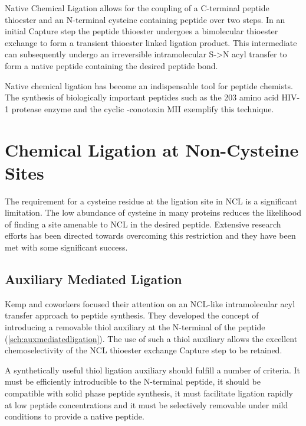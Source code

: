 Native Chemical Ligation allows for the coupling of a C-terminal peptide thioester and an N-terminal cysteine containing peptide over two steps. In an initial Capture step the peptide thioester undergoes a bimolecular thioester exchange to form a transient thioester linked ligation product. This intermediate can subsequently undergo an irreversible intramolecular S->N acyl transfer to form a native peptide containing the desired peptide bond.

Native chemical ligation has become an indispensable tool for peptide chemists. The synthesis of biologically important peptides such as the 203 amino acid HIV-1 protease enzyme\cite{torbeev_convergent_2007} and the cyclic \textalpha-conotoxin MII \cite{clark_native_2010} exemplify this technique.

\section{Chemical Ligation at Non-Cysteine Sites}

The requirement for a cysteine residue at the ligation site in NCL is a significant limitation. The low abundance of cysteine in many proteins reduces the likelihood of finding a site amenable to NCL in the desired peptide. Extensive research efforts has been directed towards overcoming this restriction and they have been met with some significant success.

    \subsection{Auxiliary Mediated Ligation}

    Kemp and coworkers focused their attention on an NCL-like intramolecular acyl transfer approach to peptide synthesis.\cite{kemp_synthesis_1993} They developed the concept of introducing a removable thiol auxiliary at the N-terminal of the peptide (\ref{sch:auxmediatedligation}). The use of such a thiol auxiliary allows the excellent chemoselectivity of the NCL thioester exchange Capture step to be retained.

    A synthetically useful thiol ligation auxiliary should fulfill a number of criteria. It must be efficiently introducible to the N-terminal peptide, it should be compatible with solid phase peptide synthesis, it must facilitate ligation rapidly at low peptide concentrations and it must be selectively removable under mild conditions to provide a native peptide. \cite{hemantha_total_2012}

